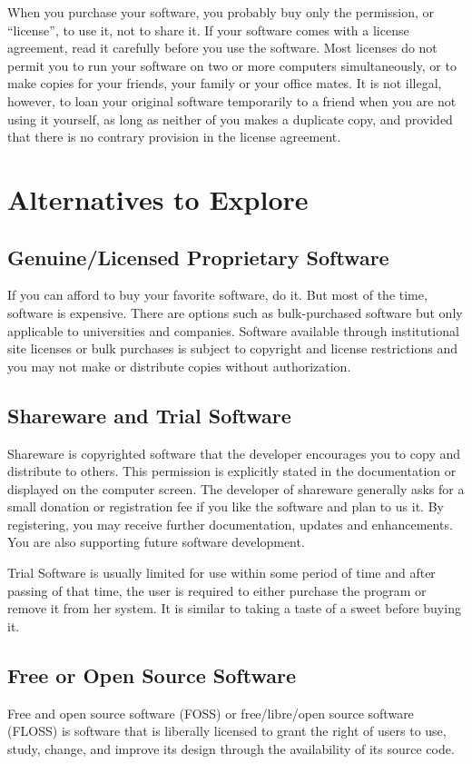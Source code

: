 When you purchase your software, you probably buy only the permission, or ``license'', to use it, not to share it. If your software comes with a license agreement, read it carefully before you use the software. Most licenses do not permit you to run your software on two or more computers simultaneously, or to make copies for your friends, your family or your office mates. It is not illegal, however, to loan your original software temporarily to a friend when you are not using it yourself, as long as neither of you makes a duplicate copy, and provided that there is no contrary provision in the license agreement.

\section{Alternatives to Explore}
\subsection{Genuine/Licensed Proprietary Software}
If you can afford to buy your favorite software, do it. But most of the time, software is expensive. There are options such as bulk-purchased software but only applicable to universities and companies. Software available through institutional site licenses or bulk purchases is subject to copyright and license restrictions and you may not make or distribute copies without authorization\textsuperscript{\cite{university}}.
\subsection{Shareware and Trial Software}
Shareware is copyrighted software that the developer encourages you to copy and distribute to others. This permission is explicitly stated in the documentation or displayed on the computer screen. The developer of shareware generally asks for a small donation or registration fee if you like the software and plan to us it. By registering, you may receive further documentation, updates and enhancements. You are also supporting future software development.

Trial Software is usually limited for use within some period of time and after passing of that time, the user is required to either purchase the program or remove it from her system. It is similar to taking a taste of a sweet before buying it.

\subsection{Free or Open Source Software}
Free and open source software (FOSS) or free/libre/open source software (FLOSS) is software that is liberally licensed to grant the right of users to use, study, change, and improve its design through the availability of its source code.

